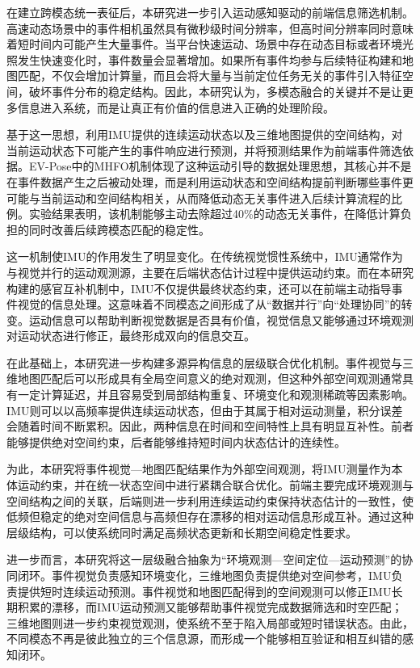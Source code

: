 在建立跨模态统一表征后，本研究进一步引入运动感知驱动的前端信息筛选机制。高速动态场景中的事件相机虽然具有微秒级时间分辨率，但高时间分辨率同时意味着短时间内可能产生大量事件。当平台快速运动、场景中存在动态目标或者环境光照发生快速变化时，事件数量会显著增加。如果所有事件均参与后续特征构建和地图匹配，不仅会增加计算量，而且会将大量与当前定位任务无关的事件引入特征空间，破坏事件分布的稳定结构。因此，本研究认为，多模态融合的关键并不是让更多信息进入系统，而是让真正有价值的信息进入正确的处理阶段。

基于这一思想，利用IMU提供的连续运动状态以及三维地图提供的空间结构，对当前运动状态下可能产生的事件响应进行预测，并将预测结果作为前端事件筛选依据。EV-Pose中的MHFO机制体现了这种运动引导的数据处理思想，其核心并不是在事件数据产生之后被动处理，而是利用运动状态和空间结构提前判断哪些事件更可能与当前运动和空间结构相关，从而降低动态无关事件进入后续计算流程的比例。实验结果表明，该机制能够主动去除超过40\%的动态无关事件，在降低计算负担的同时改善后续跨模态匹配的稳定性。

这一机制使IMU的作用发生了明显变化。在传统视觉惯性系统中，IMU通常作为与视觉并行的运动观测源，主要在后端状态估计过程中提供运动约束。而在本研究构建的感官互补机制中，IMU不仅提供最终状态约束，还可以在前端主动指导事件视觉的信息处理。这意味着不同模态之间形成了从“数据并行”向“处理协同”的转变。运动信息可以帮助判断视觉数据是否具有价值，视觉信息又能够通过环境观测对运动状态进行修正，最终形成双向的信息交互。

在此基础上，本研究进一步构建多源异构信息的层级联合优化机制。事件视觉与三维地图匹配后可以形成具有全局空间意义的绝对观测，但这种外部空间观测通常具有一定计算延迟，并且容易受到局部结构重复、环境变化和观测稀疏等因素影响。IMU则可以以高频率提供连续运动状态，但由于其属于相对运动测量，积分误差会随着时间不断累积。因此，两种信息在时间和空间特性上具有明显互补性。前者能够提供绝对空间约束，后者能够维持短时间内状态估计的连续性。

为此，本研究将事件视觉—地图匹配结果作为外部空间观测，将IMU测量作为本体运动约束，并在统一状态空间中进行紧耦合联合优化。前端主要完成环境观测与空间结构之间的关联，后端则进一步利用连续运动约束保持状态估计的一致性，使低频但稳定的绝对空间信息与高频但存在漂移的相对运动信息形成互补。通过这种层级结构，可以使系统同时满足高频状态更新和长期空间稳定性要求。

进一步而言，本研究将这一层级融合抽象为“环境观测—空间定位—运动预测”的协同闭环。事件视觉负责感知环境变化，三维地图负责提供绝对空间参考，IMU负责提供短时连续运动预测。事件视觉和地图匹配得到的空间观测可以修正IMU长期积累的漂移，而IMU运动预测又能够帮助事件视觉完成数据筛选和时空匹配；三维地图则进一步约束视觉观测，使系统不至于陷入局部或短时错误状态。由此，不同模态不再是彼此独立的三个信息源，而形成一个能够相互验证和相互纠错的感知闭环。


